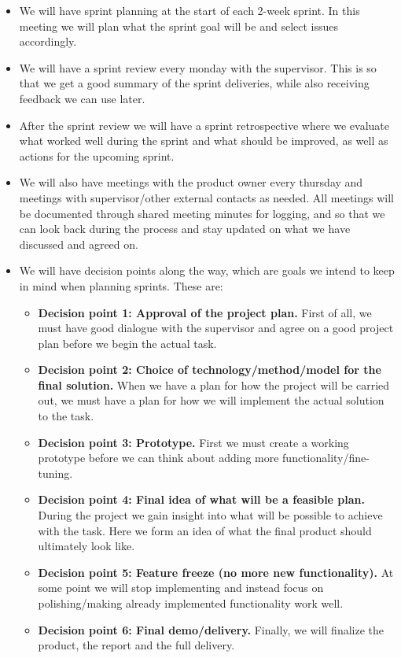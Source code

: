 \begin{itemize}
    \item We will have sprint planning at the start of each 2-week sprint. In this meeting we will plan what the sprint goal will be and select issues accordingly.
    \item We will have a sprint review every monday with the supervisor. This is so that we get a good summary of the sprint deliveries, while also receiving feedback we can use later.
    \item After the sprint review we will have a sprint retrospective where we evaluate what worked well during the sprint and what should be improved, as well as actions for the upcoming sprint.
    \item We will also have meetings with the product owner every thursday and meetings with supervisor/other external contacts as needed. All meetings will be documented through shared meeting minutes for logging, and so that we can look back during the process and stay updated on what we have discussed and agreed on.
    \item We will have decision points along the way, which are goals we intend to keep in mind when planning sprints. These are:
    \begin{itemize}
        \item \textbf{Decision point 1: Approval of the project plan.} First of all, we must have good dialogue with the supervisor and agree on a good project plan before we begin the actual task.
        \item \textbf{Decision point 2: Choice of technology/method/model for the final solution.} When we have a plan for how the project will be carried out, we must have a plan for how we will implement the actual solution to the task.
        \item \textbf{Decision point 3: Prototype.} First we must create a working prototype before we can think about adding more functionality/fine-tuning.
        \item \textbf{Decision point 4: Final idea of what will be a feasible plan.} During the project we gain insight into what will be possible to achieve with the task. Here we form an idea of what the final product should ultimately look like.
        \item \textbf{Decision point 5: Feature freeze (no more new functionality).} At some point we will stop implementing and instead focus on polishing/making already implemented functionality work well.
        \item \textbf{Decision point 6: Final demo/delivery.} Finally, we will finalize the product, the report and the full delivery.
    \end{itemize}
\end{itemize}

